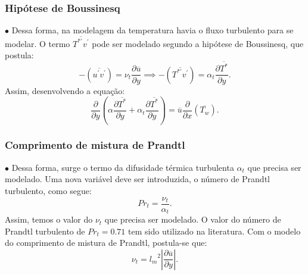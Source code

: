 \documentclass[xcolor=dvipsnames,10pt,aspectratio=169]{beamer}
\begin{document}
		
		\begin{frame}
			\frametitle{Hipótese de Boussinesq}
			$\bullet$ Dessa forma, na modelagem da temperatura havia o fluxo turbulento para se modelar. O termo $\overline{T^{\ast\prime}  v^\prime}$ pode ser modelado segundo a hipótese de Boussinesq, que postula:
			\begin{equation}\label{bou}
			-\left(\overline{ u^\prime  v^\prime}\right) = 
			\nu_t \frac{\partial{\overline{u}}}{\partial{y}}
			\implies
			-\left(\overline{ T^{\ast\prime}  v^\prime}\right) = 
			\alpha_t \frac{\partial{\overline{T^\ast}}}{\partial{y}}.
			\end{equation}
			Assim, desenvolvendo a equação: 
			\\
				\begin{equation}
				{\frac{\partial{}}{\partial{y}}} \left(\alpha {\frac{\partial{\overline{T^\ast}}}{\partial{y}}}   
				+ \alpha_t  \frac{\partial \overline{T^\ast}}{\partial y} \right)
				= 
				\overline{u}\frac{\partial{}}{\partial{x}}\left(\overline{T_w}\right) . 
				\end{equation}
		\end{frame}
	
	
	
	
		
		\begin{frame}
			\frametitle{Comprimento de mistura de Prandtl}
			$\bullet$ Dessa forma, surge o termo da difusidade térmica turbulenta $\alpha_t$ que precisa ser modelado. Uma nova variável deve ser introduzida, o número de Prandtl turbulento, como segue:
			\begin{equation}
				Pr_t = \frac{\nu_t}{\alpha_t}.
			\end{equation} 
			Assim, temos o valor do $\nu_t$ que precisa ser modelado. O valor do número de Prandtl turbulento de $ Pr_t = 0.71$ tem sido utilizado na literatura.
			Com o modelo do comprimento de mistura de Prandtl, postula-se que:
			\begin{equation}
			\nu_t = {l_m}^2 \left| \frac{\partial \overline{u}}{\partial y} \right|.
			\end{equation}
		\end{frame}
		
		
		
		
		
\end{document}
